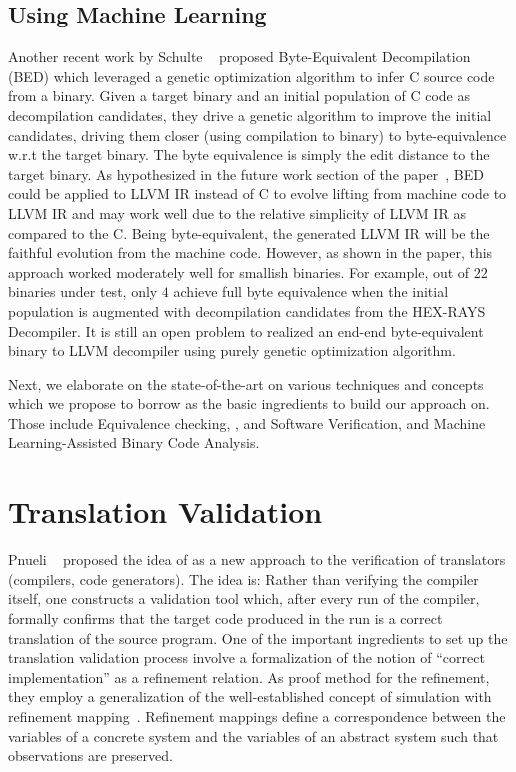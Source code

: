 \subsection{Using Machine Learning} Another recent work by Schulte
\etal~\cite{eschulte2018bed} proposed Byte-Equivalent Decompilation (BED) which
leveraged a genetic optimization algorithm to infer C source code from a
binary. Given a target binary and an initial population of C code as
decompilation candidates, they  drive a genetic algorithm to improve the
initial candidates, driving them closer (using compilation to binary) to
byte-equivalence w.r.t the target binary. The byte equivalence  is simply the
edit distance to the target binary. As hypothesized in the future work section
of the paper~\cite{eschulte2018bed}, BED could be applied to LLVM IR instead of
C to evolve lifting from machine code to LLVM IR and may work well due to the
relative simplicity of LLVM IR as compared to the C. Being byte-equivalent, the
generated LLVM IR will be the faithful evolution from the machine code.
However, as shown in the paper, this approach worked moderately well for
smallish binaries. For example, out of $22$ binaries under test, only $4$ achieve full byte equivalence when the initial
    population is augmented with decompilation candidates from the
    HEX-RAYS~\cite{hexray} Decompiler. It is still an open problem to realized
    an end-end byte-equivalent binary to LLVM decompiler using purely genetic
    optimization algorithm. 

Next, we elaborate on the state-of-the-art on various techniques and concepts
which we propose to borrow as the basic ingredients to build our approach on. Those
include Equivalence checking, \TV, and Software Verification, and Machine Learning-Assisted Binary Code Analysis.

\section{Translation Validation}

Pnueli \etal~\cite{Pnueli:1998} proposed the idea of \tv as a new approach to
the verification of translators (compilers, code generators). The idea is:
Rather than verifying the compiler itself, one constructs a validation tool
which, after every run of the compiler, formally confirms that the target code
produced in the run is a correct translation of the source program. One of the
important ingredients  to set up the  translation validation process involve a
formalization of the notion of ``correct implementation'' as a refinement
relation. As proof method for the refinement, they employ a generalization of
the well-established concept of simulation with refinement
mapping~\cite{Abadi:1991}. Refinement mappings define a correspondence between
the variables of a concrete system and the variables of an abstract system such
that observations are preserved. 

